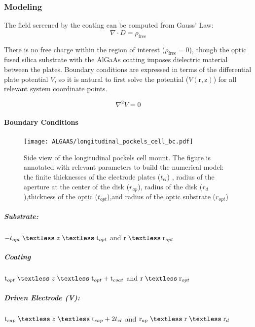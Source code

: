 \subsubsection*{Modeling}
The field screened by the coating can be computed from Gauss' Law:
\begin{equation}
\nabla \cdot D = \rho_\mathrm{free}
\end{equation}

\noindent There is no free charge within the region of interest ($\rho_\mathrm{free}=0$), though the optic fused silica substrate with the AlGaAs coating imposes dielectric material between the plates. Boundary conditions are expressed in terms of the differential plate potential $V$, so it is natural to first solve the potential ($V(\mathrm{r, z})$) for all relevant system coordinate points.  

\begin{equation}\label{eq:cyllap}
\nabla^2 V = 0
\end{equation}

\paragraph*{Boundary Conditions}

\begin{figure}[H]
  \centering
  \texttt{[image: ALGAAS/longitudinal\_pockels\_cell\_bc.pdf]}
\caption{Side view of the longitudinal pockels cell mount. The figure is annotated with relevant parameters to build the numerical model: the finite thicknesses of the electrode plates ($t_{el}$) , radius of the aperture at the center of the disk ($r_{ap}$), radius of the disk ($r_d$),thickness of the optic ($t_{opt}$),and radius of the optic substrate ($r_{opt}$)}
  \label{fig:laplacecoords}
\end{figure}

\subparagraph*{Substrate:}
$ -t_{opt} \; \textless \; z \; \textless \;\mathrm{t}_{opt} $ and $\mathrm{r} \; \textless \;\mathrm{r}_{opt}$
\subparagraph*{Coating}
$\mathrm{t}_{opt} \; \textless \; z \; \textless \;\mathrm{t}_{opt} +\mathrm{t}_{coat} $ and $\mathrm{r} \; \textless \;\mathrm{r}_{opt} $

\subparagraph*{Driven Electrode (V):}
$\mathrm{t}_{cap} \; \textless \; z \; \textless \;\mathrm{t}_{cap} + 2t_{el} $ and $\mathrm{r}_{ap} \; \textless \;\mathrm{r} \; \textless \;\mathrm{r}_{d} $

